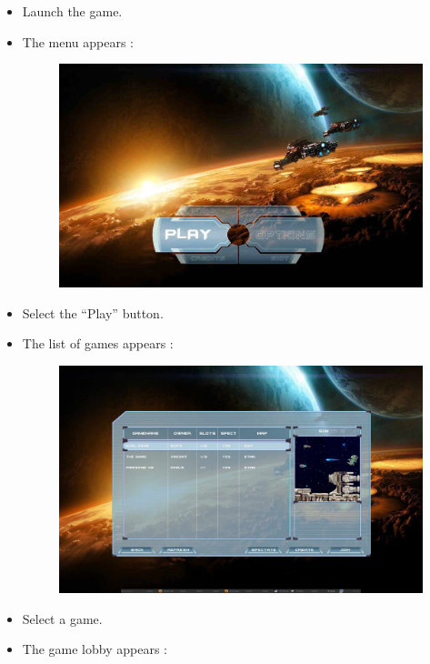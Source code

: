 \documentclass{koala-fr}
\begin{document}
\begin{itemize}
  \item Launch the game.
  \item The menu appears :
\begin{figure}[H]
      \begin{center}
        \includegraphics[width=15cm]{menu.jpg}
      \end{center}
    \end{figure}    
  \item Select the ``Play'' button.
  \item The list of games appears :
\begin{figure}[H]
      \begin{center}
        \includegraphics[width=15cm]{list.jpg}
      \end{center}
    \end{figure}
  \item Select a game.
  \item The game lobby appears :

\end{itemize}
\end{document}
